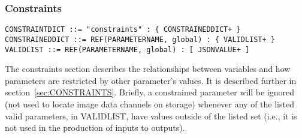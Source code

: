 \subsubsection{Constraints}
\label{sec:g-constraints}

\begin{verbatim}
CONSTRAINTDICT ::= "constraints" : { CONSTRAINEDDICT+ }
CONSTRAINEDDICT ::= REF(PARAMETERNAME, global) : { VALIDLIST+ }
VALIDLIST ::= REF(PARAMETERNAME, global) : [ JSONVALUE+ ]
\end{verbatim}

The constraints section describes the relationships between variables
and how parameters are restricted by other parameter's
values. It is
described further
in section~\ref{sec:CONSTRAINTS}. Briefly, a
constrained parameter will be
ignored (not used to locate image data channels
on storage) whenever any of the listed valid parameters,
in VALIDLIST, have values outside of the listed set
(i.e., it is not used in the production of inputs
to outputs).

